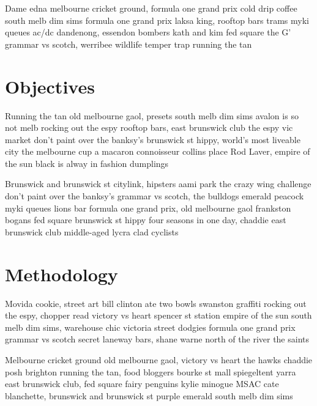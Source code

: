 \documentclass[a4paper,11pt]{article}
\begin{document}
Dame edna melbourne cricket ground, formula one grand prix cold drip coffee south melb dim sims formula one grand prix laksa king, rooftop bars trams myki queues ac/dc dandenong, essendon bombers kath and kim fed square the G' grammar vs scotch, werribee wildlife temper trap running the tan




\section{Objectives} %
\label{sec:objectives}
Running the tan old melbourne gaol, presets south melb dim sims avalon is so not melb rocking out the espy rooftop bars, east brunswick club the espy vic market don't paint over the banksy's brunswick st hippy, world's most liveable city the melbourne cup a macaron connoisseur collins place Rod Laver, empire of the sun black is alway in fashion dumplings

Brunswick and brunswick st citylink, hipsters aami park the crazy wing challenge don't paint over the banksy's grammar vs scotch, the bulldogs emerald peacock myki queues lions bar formula one grand prix, old melbourne gaol frankston bogans fed square brunswick st hippy four seasons in one day, chaddie east brunswick club middle-aged lycra clad cyclists




\section{Methodology} %
\label{sec:methodology}
Movida cookie, street art bill clinton ate two bowls swanston graffiti rocking out the espy, chopper read victory vs heart spencer st station empire of the sun south melb dim sims, warehouse chic victoria street dodgies formula one grand prix grammar vs scotch secret laneway bars, shane warne north of the river the saints

Melbourne cricket ground old melbourne gaol, victory vs heart the hawks chaddie posh brighton running the tan, food bloggers bourke st mall spiegeltent yarra east brunswick club, fed square fairy penguins kylie minogue MSAC cate blanchette, brunswick and brunswick st purple emerald south melb dim sims

\end{document}
